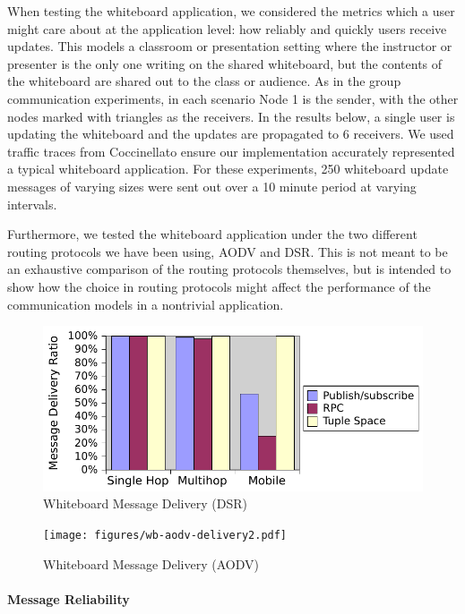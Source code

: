 When testing the whiteboard application, we considered the metrics which a user might care about at the application level: how reliably and quickly users receive updates.
This models a classroom or presentation setting where the instructor or presenter is the only one writing on the shared whiteboard, but the contents of the whiteboard are shared out to the class or audience. As in the group communication experiments, in each scenario Node 1 is the sender, with the other nodes marked with triangles as the receivers.
In the results below, a single user is updating the whiteboard and the updates are propagated to 6 receivers. We used traffic traces from  Coccinella\footnotemark to ensure our implementation accurately represented a typical whiteboard application. For these experiments, 250 whiteboard update messages of varying sizes were sent out over a 10 minute period at varying intervals.


Furthermore, we tested the whiteboard application under the two different routing protocols we have been using, AODV and DSR. This is not meant to be an exhaustive comparison of the routing protocols themselves, but is intended to show how the choice in routing protocols might affect the performance of the communication models in a nontrivial application.

\begin{figure}
\includegraphics[width = .9\textwidth, clip, trim = 6px 0px 4px 0px]{figures/wb-dsr-delivery.pdf}
\caption{Whiteboard Message Delivery (DSR)}
\label{fig:wbdeliverydsr}
\end{figure}	

\begin{figure}
\texttt{[image: figures/wb-aodv-delivery2.pdf]}
\caption{Whiteboard Message Delivery (AODV)}
\label{fig:wbdeliveryaodv}
\end{figure}

\paragraph{Message Reliability}

